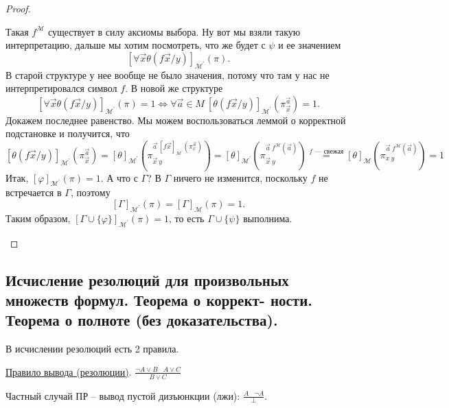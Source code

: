 \documentclass[a4paper, fleqn]{article}
\begin{document}
\begin{proof}
\begin{enumerate}
            Такая $f^{\mathcal{M}}$ существует в силу аксиомы выбора.
            Ну вот мы взяли такую интерпретацию, дальше мы хотим посмотреть, что же будет с $\psi$ и ее значением
            $$
            [\forall \vec{x} \theta (f\vec{x}/y)]_{\mathcal{M}^{\prime}}(\pi).
            $$
            В старой структуре у нее вообще не было значения, потому что там у нас не интерпретировался символ $f$.
            В новой же структуре
            $$
            [\forall \vec{x} \theta (f\vec{x}/y)]_{\mathcal{M}^{\prime}}(\pi) = 1 \iff \forall \vec{a} \in M~ [\theta(f\vec{x}/y)]_{\mathcal{M}^{\prime}}(\pi_{\vec{x}}^{\vec{a}}) = 1.
            $$
            Докажем последнее равенство.
            Мы можем воспользоваться леммой о корректной подстановке и получится, что
            $$
            [\theta(f\vec{x}/y)]_{\mathcal{M}^{\prime}}(\pi_{\vec{x}}^{\vec{a}}) = [\theta]_{\mathcal{M}^{\prime}}\left(\pi_{\vec{x}~y}^{\vec{a}~[f\vec{x}]_{\mathcal{M}^{\prime}}(\pi_{x}^{\vec{a}})}\right) = [\theta]_{\mathcal{M}^{\prime}}\left(\pi_{\vec{x}~y}^{\vec{a}~f^{\mathcal{M}}(\vec{a})}\right) \overset{f\text{ --- свежая}}{=} [\theta]_{\mathcal{M}}\left(\pi_{x~y}^{\vec{a}~f^{\mathcal{M}}(\vec{a})}\right) = 1
            $$
            Итак, $[\varphi]_{\mathcal{M}^{\prime}}(\pi) = 1$.
            А что с $\Gamma$?
            В $\Gamma$ ничего не изменится, поскольку $f$ не встречается в $\Gamma$, поэтому
            $$
            [\Gamma]_{\mathcal{M}^{\prime}}(\pi) = [\Gamma]_{\mathcal{M}}(\pi) = 1.
            $$
            Таким образом, $[\Gamma \cup \{ \varphi\}]_{\mathcal{M}^{\prime}}(\pi) = 1$, то есть $\Gamma \cup \{\psi\}$ выполнима. \qedhere
        \end{enumerate}
    \end{proof}
    
    \subsection{Исчисление резолюций для произвольных множеств формул. Теорема о коррект- ности.
        Теорема о полноте (без доказательства).}

    В исчислении резолюций есть 2 правила.


    \underline{Правило вывода (резолюции)}. $\boxed{\frac{\neg A \lor B \; \; \; A \lor C}{B \lor C} } $

    Частный случай ПР -- вывод пустой дизъюнкции (лжи): $\frac{A \; \; \; \neg A}{\perp}.$
\end{document}
